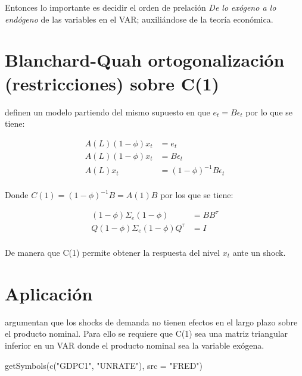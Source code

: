 \documentclass[
]{book}
\newenvironment{Shaded}{\begin{snugshade}}{\end{snugshade}}
\newcommand{\AttributeTok}[1]{\textcolor[rgb]{0.77,0.63,0.00}{#1}}
\newcommand{\FunctionTok}[1]{\textcolor[rgb]{0.00,0.00,0.00}{#1}}
\newcommand{\NormalTok}[1]{#1}
\newcommand{\StringTok}[1]{\textcolor[rgb]{0.31,0.60,0.02}{#1}}
\begin{document}
Entonces lo importante es decidir el orden de prelación \emph{De lo exógeno a lo endógeno} de las variables en el VAR; auxiliándose de la teoría económica.

\hypertarget{blanchard-quah-ortogonalizaciuxf3n-restricciones-sobre-c1}{%
\section{Blanchard-Quah ortogonalización (restricciones) sobre C(1)}\label{blanchard-quah-ortogonalizaciuxf3n-restricciones-sobre-c1}}

\citet{BLANCHARD88} definen un modelo partiendo del mismo supuesto en que \(e_{t}=B\epsilon_{t}\) por lo que se tiene:

\begin{align}
A(L)(1-\phi)x_{t}&=e_{t}\\
A(L)(1-\phi)x_{t}&=B\epsilon_{t}\\
A(L)x_{t}&=(1-\phi)^{-1}B\epsilon_{t}\\
\end{align}

Donde \(C(1)=(1-\phi)^{-1}B=A(1)B\) por los que se tiene:

\begin{align}
(1-\phi)\Sigma_{e}(1-\phi)&=BB^{\tau}\\
Q(1-\phi)\Sigma_e(1-\phi)Q^{\tau}&=I\\
\end{align}

De manera que C(1) permite obtener la respuesta del nivel \(x_{t}\) ante un shock.

\hypertarget{aplicaciuxf3n-blanchard88}{%
\section{\texorpdfstring{Aplicación \citet{BLANCHARD88}}{Aplicación @BLANCHARD88}}\label{aplicaciuxf3n-blanchard88}}

\citet{BLANCHARD88} argumentan que los shocks de demanda no tienen efectos en el largo plazo sobre el producto nominal. Para ello se requiere que C(1) sea una matriz triangular inferior en un VAR donde el producto nominal sea la variable exógena.

\begin{Shaded}
\begin{Highlighting}[]
\FunctionTok{getSymbols}\NormalTok{(}\FunctionTok{c}\NormalTok{(}\StringTok{"GDPC1"}\NormalTok{, }\StringTok{"UNRATE"}\NormalTok{),}
           \AttributeTok{src =} \StringTok{"FRED"}\NormalTok{)}
\end{Highlighting}
\end{Shaded}
\end{document}
